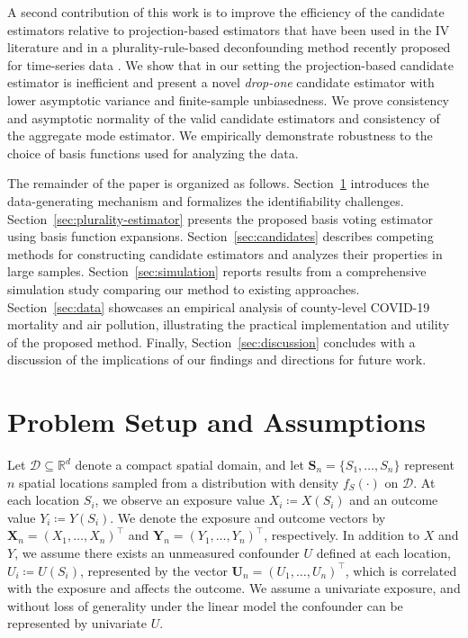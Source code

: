 \documentclass[
  12pt]{article}
\newcommand{\bX}{\boldsymbol{X}}
\newcommand{\bY}{\boldsymbol{Y}}
\newcommand{\bS}{\boldsymbol{S}}
\newcommand{\bU}{\boldsymbol{U}}
\begin{document}
A second contribution of this work is to improve the efficiency of the candidate estimators relative to projection-based estimators that have been used in the IV literature and in a plurality-rule-based deconfounding method recently proposed for time-series data \citep{schur2025decor}. 
We show that in our setting the projection-based candidate estimator is inefficient and present a novel \textit{drop-one} candidate estimator with lower asymptotic variance and finite-sample unbiasedness. We prove consistency and asymptotic normality of the valid  candidate estimators and consistency of the aggregate mode estimator. We empirically demonstrate robustness to the choice of basis functions used for analyzing the data.

The remainder of the paper is organized as follows. Section~\ref{sec:problem-setup} introduces the data-generating mechanism and formalizes the identifiability challenges. Section~\ref{sec:plurality-estimator} presents the proposed basis voting estimator using basis function expansions. Section~\ref{sec:candidates} describes competing methods for constructing candidate estimators and analyzes their properties in large samples.   Section~\ref{sec:simulation} reports results from a comprehensive simulation study comparing our method to existing approaches. Section~\ref{sec:data} showcases an empirical analysis of county-level COVID-19 mortality and air pollution, illustrating the practical implementation and utility of the proposed method. Finally, Section~\ref{sec:discussion} concludes with a discussion of the implications of our findings and directions for future work.

\section{Problem Setup and Assumptions}\label{sec:problem-setup}

Let $\mathcal{D} \subseteq \mathbb{R}^d$ denote a compact spatial domain, and let $\bS_n = \{S_1, \dots, S_n\}$ represent $n$ spatial locations sampled  from a distribution with density $f_S(\cdot)$ on $\mathcal{D}$. At each location $S_i$, we observe an exposure value $X_i \coloneqq X(S_i)$ and an outcome value $Y_i \coloneqq Y(S_i)$. We denote the exposure and outcome vectors by $\bX_n = (X_1, \dots, X_n)^\top$ and $\bY_n = (Y_1, \dots, Y_n)^\top$, respectively. In addition to $X$ and $Y$, we assume there exists an unmeasured confounder $U$ defined at each location, $U_i\coloneqq U(S_i)$, represented by the vector $\bU_n = (U_1, \dots, U_n)^\top$, which is correlated with the exposure and affects the outcome. We assume a univariate exposure, and without loss of generality under the linear model the confounder can be represented by univariate $U$.%
\end{document}
